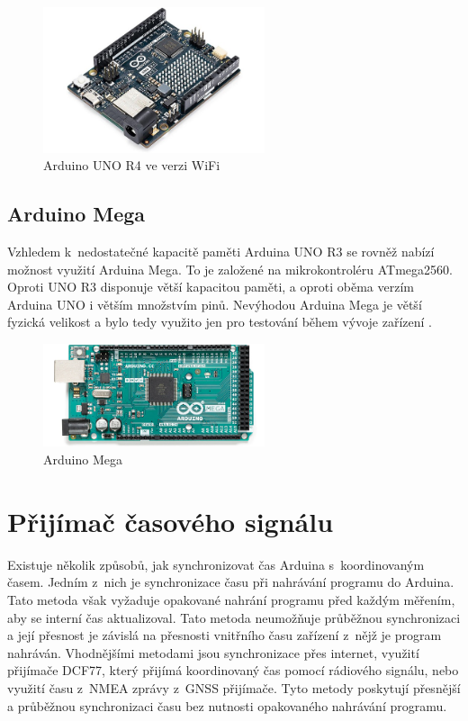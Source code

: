 \begin{figure}[H]
	\centering
	\includegraphics[width=6.5cm]{images/komponenty/UNO_R4.jpg}
	\caption{Arduino UNO R4 ve verzi WiFi \cite{laskakit_web}}
\end{figure}


\subsection{Arduino Mega}
Vzhledem k~nedostatečné kapacitě paměti Arduina UNO R3 se rovněž nabízí možnost využití Arduina Mega. To je založené na mikrokontroléru ATmega2560. Oproti  UNO R3 disponuje větší kapacitou paměti, a oproti oběma verzím Arduina UNO i větším množstvím pinů. Nevýhodou Arduina Mega je větší fyzická velikost a bylo tedy využito jen pro testování během vývoje zařízení \cite{arduino}.


\begin{figure}[H]
	\centering
	\includegraphics[width=6.5cm]{images/komponenty/mega.png}
	\caption{Arduino Mega \cite{arduino}}
\end{figure}

\section{Přijímač časového signálu}
Existuje několik způsobů, jak synchronizovat čas Arduina s~koordinovaným časem. Jedním z~nich je synchronizace času při nahrávání programu do Arduina. Tato metoda však vyžaduje opakované nahrání programu před každým měřením, aby se interní čas aktualizoval. Tato metoda neumožňuje průběžnou synchronizaci a její přesnost je závislá na přesnosti vnitřního času zařízení z~nějž je program nahráván. Vhodnějšími metodami jsou synchronizace přes internet, využití přijímače DCF77, který přijímá koordinovaný čas pomocí rádiového signálu, nebo využití času z~NMEA zprávy z~GNSS přijímače. Tyto metody poskytují přesnější a průběžnou synchronizaci času bez nutnosti opakovaného nahrávání programu.

